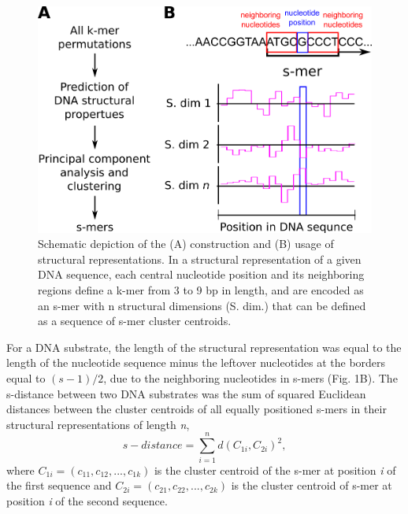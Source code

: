 \documentclass[sigconf]{acmart}
\begin{document}
\begin{figure}[ht]
  \centering
  \includegraphics[width=\linewidth]{smir_fig_smers.png}
  \caption{Schematic depiction of the (A) construction and (B) usage of structural representations. In a structural representation of a given DNA sequence, each central nucleotide position and its neighboring regions define a k-mer from 3 to 9 bp in length, and are encoded as an s-mer with n structural dimensions (S. dim.) that can be defined as a sequence of s-mer cluster centroids.}
\end{figure}

For a DNA substrate, the length of the structural representation was equal to the length of the nucleotide sequence minus the leftover nucleotides at the borders equal to $(s-1)/2$, due to the neighboring nucleotides in s-mers (Fig. 1B). The s-distance between two DNA substrates was the sum of squared Euclidean distances between the cluster centroids of all equally positioned s-mers in their structural representations of length \textit{n},
\begin{equation}
  s-distance=\sum_{i=1}^{n}d(C_{1i}, C_{2i})^2,
\end{equation}
where \(C_{1i} = (c_{11}, c_{12},..., c_{1k})\) is the cluster centroid of the s-mer at position \textit{i} of the first sequence and \(C_{2i} = (c_{21}, c_{22},..., c_{2k})\) is the cluster centroid of s-mer at position \textit{i} of the second sequence.
\end{document}
